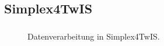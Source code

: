 \subsection{Simplex4TwIS}
\begin{frame}
  \frametitle{\currentsectionname}

  \begin{figure}
    
    \caption{Datenverarbeitung in Simplex4TwIS.}
  \end{figure}

  \note{
    \begin{itemize}
    \end{itemize}
  }

\end{frame}
